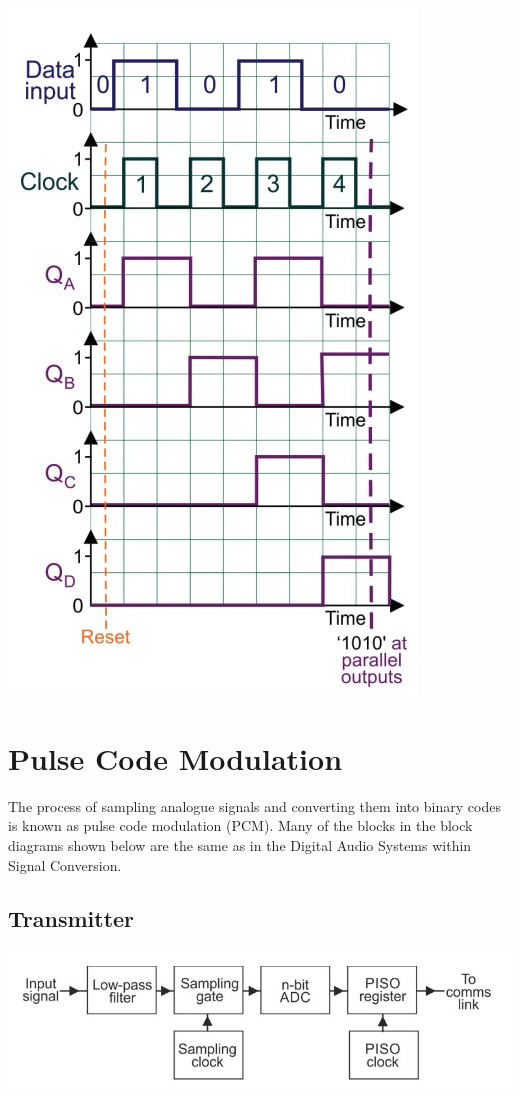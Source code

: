 \documentclass[a4paper,11pt, twocolumn]{article}
\begin{document}
\includegraphics[width=\linewidth]{sipoTiming.jpg}

\section{Pulse Code Modulation}
The process of sampling analogue signals and converting them into binary codes is known as pulse code modulation (PCM). Many of the blocks in the block diagrams shown below are the same as in the Digital Audio Systems within Signal Conversion.
\subsection{Transmitter}
\includegraphics[width=\linewidth]{pcmTransmitterBlockDiagram.jpg}
\end{document}
